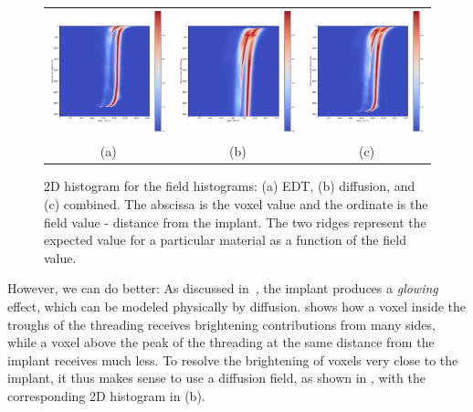 \begin{figure}
    \centering
    \begin{tabular}{ccc}
        \includegraphics[width=.31\linewidth]{generated/770c_pag_hist_2d_edt.pdf} &
        \includegraphics[width=.31\linewidth]{generated/770c_pag_hist_2d_gauss.pdf} &
        \includegraphics[width=.31\linewidth]{generated/770c_pag_hist_2d_gauss+edt.pdf} \\
        (a) & (b) & (c)
    \end{tabular}
    \caption{
        2D histogram for the field histograms: (a) EDT, (b) diffusion, and (c)
        combined. The abscissa is the voxel value and the ordinate is the field
        value - distance from the implant. The two ridges represent the
        expected value for a particular material as a function of the field
        value.
    }
    \label{fig:fieldhists}
\end{figure}

However, we can do better: As discussed in~, the implant
produces a \textit{glowing} effect, which can be modeled physically by
diffusion.  shows how a voxel inside the troughs of
the threading receives brightening contributions from many sides, while a voxel
above the peak of the threading at the same distance from the implant receives
much less. To resolve the brightening of voxels very close to the implant, it
thus makes sense to use a diffusion field, as shown in ,
with the corresponding 2D histogram in (b).

